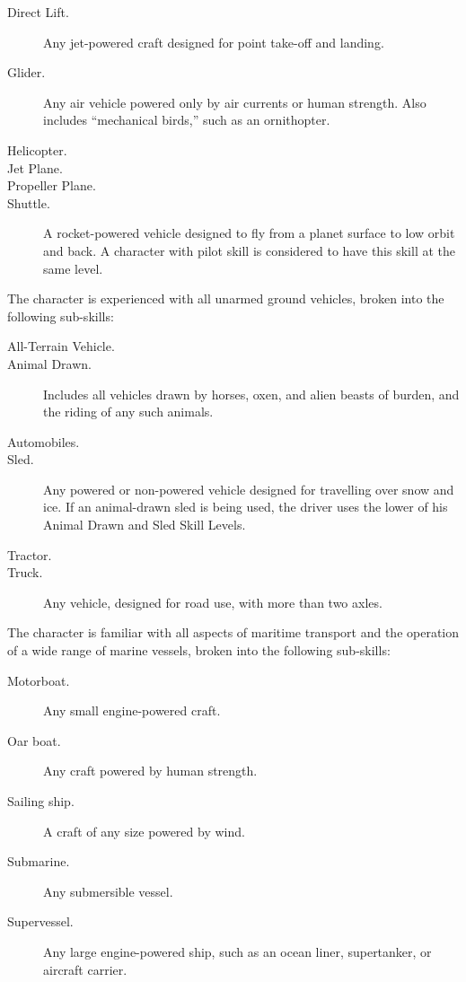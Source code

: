 \begin{description}
\item[Direct Lift.]  Any jet-powered craft designed for point take-off
  and landing.
\item[Glider.] Any air vehicle powered only by air currents or human
  strength.  Also includes ``mechanical birds,'' such as an
  ornithopter.
\item[Helicopter.]
\item[Jet Plane.]
\item[Propeller Plane.]
\item[Shuttle.]  A rocket-powered vehicle designed to fly from a
  planet surface to low orbit and back.  A character with pilot skill
  is considered to have this skill at the same level.
\end{description}

\label{sec:skill-ground-vehicles}

The character is experienced with all unarmed ground vehicles, broken
into the following sub-skills:

\begin{description}
\item[All-Terrain Vehicle.]
\item[Animal Drawn.] Includes all vehicles drawn by horses, oxen, and
  alien beasts of burden, and the riding of any such animals.
\item[Automobiles.] 
\item[Sled.] Any powered or non-powered vehicle designed for
   travelling over snow and ice.   If an animal-drawn sled is being
   used, the driver uses the  lower of his Animal Drawn and Sled
   Skill Levels.
 \item[Tractor.] 
 \item[Truck.] Any vehicle, designed for road use, with more than two
   axles.
 \end{description}
 
\label{sec:skill-marine-vehicles}

The character is familiar with all aspects of maritime transport and
the operation of a wide range of marine vessels, broken into the
following sub-skills:

\begin{description}
\item[Motorboat.] Any small engine-powered craft.
\item[Oar boat.] Any craft powered by human strength.
\item[Sailing ship.] A craft of any size powered by wind.
\item[Submarine.] Any submersible vessel.
\item[Supervessel.] Any large engine-powered ship, such as an ocean
  liner, supertanker, or aircraft carrier.
\end{description}

